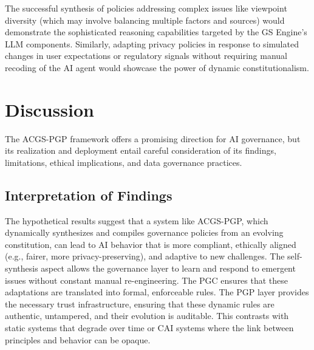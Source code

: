 \documentclass[sigconf,review,screen]{acmart}
\begin{document}
The successful synthesis of policies addressing complex issues like viewpoint diversity (which may involve balancing multiple factors and sources) would demonstrate the sophisticated reasoning capabilities targeted by the GS Engine's LLM components. Similarly, adapting privacy policies in response to simulated changes in user expectations or regulatory signals without requiring manual recoding of the AI agent would showcase the power of dynamic constitutionalism.

\section{Discussion}
The ACGS-PGP framework offers a promising direction for AI governance, but its realization and deployment entail careful consideration of its findings, limitations, ethical implications, and data governance practices.

\subsection{Interpretation of Findings}
The hypothetical results suggest that a system like ACGS-PGP, which dynamically synthesizes and compiles governance policies from an evolving constitution, can lead to AI behavior that is more compliant, ethically aligned (e.g., fairer, more privacy-preserving), and adaptive to new challenges. The self-synthesis aspect allows the governance layer to learn and respond to emergent issues without constant manual re-engineering. The PGC ensures that these adaptations are translated into formal, enforceable rules. The PGP layer provides the necessary trust infrastructure, ensuring that these dynamic rules are authentic, untampered, and their evolution is auditable. This contrasts with static systems that degrade over time or CAI systems where the link between principles and behavior can be opaque.
\end{document}
